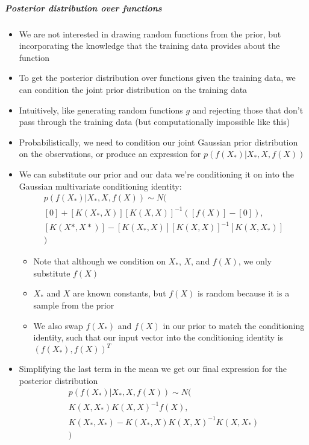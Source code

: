 \documentclass[12pt]{article}
\begin{document}
\subparagraph{Posterior distribution over functions}
\begin{itemize}
    \item We are not interested in drawing random functions from the prior, but incorporating the knowledge that the training data provides about the function
    \item To get the posterior distribution over functions given the training data, we can condition the joint prior distribution on the training data
    \item Intuitively, like generating random functions $g$ and rejecting those that don't pass through the training data (but computationally impossible like this)
    \item Probabilistically, we need to condition our joint Gaussian prior distribution on the observations, or produce an expression for $p(f(X_*)|X_*, X, f(X))$
    \item We can substitute our prior and our data we're conditioning it on into the Gaussian multivariate conditioning identity:
\begin{equation}
    \begin{aligned}
        p(f(X_*)|X_*, X, f(X)) \sim N( \\
        [0] + [K(X_*,X)][K(X,X)]^{-1}([f(X)] - [0]), \\
        [K(X*,X*)] - [K(X_*,X)][K(X,X)]^{-1}[K(X,X_*)] \\
        )
    \end{aligned}
\end{equation}
    \begin{itemize}
        \item Note that although we condition on $X_*$, $X$, and $f(X)$, we only substitute $f(X)$
        \item $X_*$ and $X$ are known constants, but $f(X)$ is random because it is a sample from the prior
        \item We also swap $f(X_*)$ and $f(X)$ in our prior to match the conditioning identity, such that our input vector into the conditioning identity is $(f(X_*), f(X))^T$
    \end{itemize}
    \item Simplifying the last term in the mean we get our final expression for the posterior distribution
\begin{equation}
    \begin{aligned}
        p(f(X_*)|X_*, X, f(X)) \sim N( \\
        K(X,X_*)K(X,X)^{-1}f(X), \\
        K(X_*,X_*) - K(X_*,X)K(X,X)^{-1}K(X,X_*) \\
        )
    \end{aligned}
\end{equation}
\end{itemize}
\end{document}
